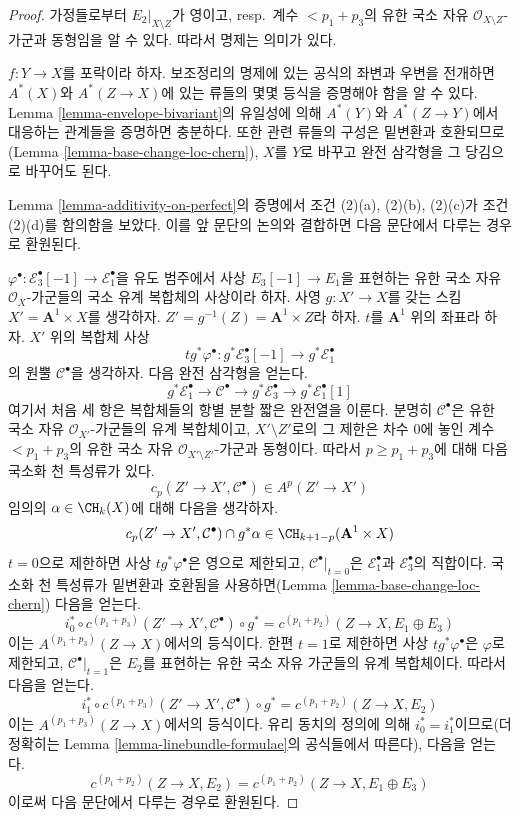 \begin{proof}
가정들로부터 $E_2|_{X \setminus Z}$가 영이고, resp.\ 계수
$< p_1 + p_3$의 유한 국소 자유 $\mathcal{O}_{X \setminus Z}$-가군과
동형임을 알 수 있다. 따라서 명제는 의미가 있다.

\medskip\noindent
$f : Y \to X$를 포락이라 하자. 보조정리의 명제에 있는 공식의
좌변과 우변을 전개하면 $A^*(X)$와 $A^*(Z \to X)$에 있는 류들의
몇몇 등식을 증명해야 함을 알 수 있다. Lemma
\ref{lemma-envelope-bivariant}의 유일성에 의해 $A^*(Y)$와
$A^*(Z \to Y)$에서 대응하는 관계들을 증명하면 충분하다. 또한 관련
류들의 구성은 밑변환과 호환되므로(Lemma
\ref{lemma-base-change-loc-chern}), $X$를 $Y$로 바꾸고 완전 삼각형을
그 당김으로 바꾸어도 된다.

\medskip\noindent
Lemma \ref{lemma-additivity-on-perfect}의 증명에서 조건 (2)(a),
(2)(b), (2)(c)가 조건 (2)(d)를 함의함을 보았다. 이를 앞 문단의
논의와 결합하면 다음 문단에서 다루는 경우로 환원된다.

\medskip\noindent
$\varphi^\bullet : \mathcal{E}_3^\bullet[-1] \to \mathcal{E}_1^\bullet$을
유도 범주에서 사상 $E_3[-1] \to E_1$을 표현하는 유한 국소 자유
$\mathcal{O}_X$-가군들의 국소 유계 복합체의 사상이라 하자.
사영 $g : X' \to X$를 갖는 스킴
$X' = \mathbf{A}^1 \times X$를 생각하자.
$Z' = g^{-1}(Z) = \mathbf{A}^1 \times Z$라 하자.
$t$를 $\mathbf{A}^1$ 위의 좌표라 하자. $X'$ 위의 복합체 사상
$$
t g^*\varphi^\bullet :
g^*\mathcal{E}_3^\bullet[-1]
\longrightarrow
g^*\mathcal{E}_1^\bullet
$$
의 원뿔 $\mathcal{C}^\bullet$을 생각하자. 다음 완전 삼각형을 얻는다.
$$
g^*\mathcal{E}_1^\bullet \to \mathcal{C}^\bullet \to
g^*\mathcal{E}_3^\bullet \to g^*\mathcal{E}_1^\bullet[1]
$$
여기서 처음 세 항은 복합체들의 항별 분할 짧은 완전열을 이룬다.
분명히 $\mathcal{C}^\bullet$은 유한 국소 자유
$\mathcal{O}_{X'}$-가군들의 유계 복합체이고, $X' \setminus Z'$로의
그 제한은 차수 $0$에 놓인 계수 $< p_1 + p_3$의 유한 국소 자유
$\mathcal{O}_{X' \setminus Z'}$-가군과 동형이다. 따라서 $p \geq p_1 + p_3$에
대해 다음 국소화 천 특성류가 있다.
$$
c_p(Z' \to X', \mathcal{C}^\bullet) \in A^p(Z' \to X')
$$
임의의 $\alpha \in \CH_k(X)$에 대해 다음을 생각하자.
$$
c_p(Z' \to X', \mathcal{C}^\bullet) \cap g^*\alpha
\in \CH_{k + 1 - p}(\mathbf{A}^1 \times X)
$$
$t = 0$으로 제한하면 사상 $t g^*\varphi^\bullet$은 영으로 제한되고,
$\mathcal{C}^\bullet|_{t = 0}$은 $\mathcal{E}_1^\bullet$과
$\mathcal{E}_3^\bullet$의 직합이다. 국소화 천 특성류가 밑변환과
호환됨을 사용하면(Lemma \ref{lemma-base-change-loc-chern}) 다음을 얻는다.
$$
i_0^* \circ c^{(p_1 + p_3)}(Z' \to X', \mathcal{C}^\bullet) \circ g^* =
c^{(p_1 + p_2)}(Z \to X, E_1 \oplus E_3)
$$
이는 $A^{(p_1 + p_3)}(Z \to X)$에서의 등식이다. 한편 $t = 1$로
제한하면 사상 $t g^*\varphi^\bullet$은 $\varphi$로 제한되고,
$\mathcal{C}^\bullet|_{t = 1}$은 $E_2$를 표현하는 유한 국소 자유
가군들의 유계 복합체이다. 따라서 다음을 얻는다.
$$
i_1^* \circ c^{(p_1 + p_3)}(Z' \to X', \mathcal{C}^\bullet) \circ g^* =
c^{(p_1 + p_2)}(Z \to X, E_2)
$$
이는 $A^{(p_1 + p_3)}(Z \to X)$에서의 등식이다. 유리 동치의 정의에
의해 $i_0^* = i_1^*$이므로(더 정확히는 Lemma
\ref{lemma-linebundle-formulae}의 공식들에서 따른다), 다음을 얻는다.
$$
c^{(p_1 + p_2)}(Z \to X, E_2) = c^{(p_1 + p_2)}(Z \to X, E_1 \oplus E_3)
$$
이로써 다음 문단에서 다루는 경우로 환원된다.


\end{proof}
